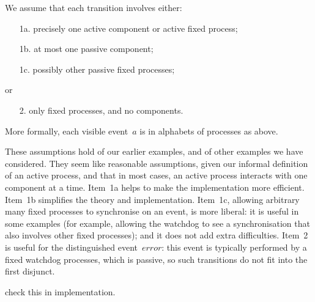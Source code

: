 \begin{assumption}
We assume that each transition involves either:
%
\begin{enumerate}
\item[1a.] precisely one active component or active fixed process;
\item[1b.] at most one passive component;
\item[1c.] possibly other passive fixed processes;
\end{enumerate}
%
or
\begin{enumerate}
\item[2.] only fixed processes, and no components.
\end{enumerate}
%
More formally, each visible event~$a$ is in alphabets of processes as above. 
\end{assumption}
%
These assumptions hold of our earlier examples, and of other examples we have
considered.  They seem like reasonable assumptions, given our informal
definition of an active process, and that in most cases, an active process
interacts with one component at a time.  Item~1a helps to make the
implementation more efficient.  Item~1b simplifies the theory and
implementation.  Item~1c, allowing arbitrary many fixed processes to
synchronise on an event, is more liberal: it is useful in some examples (for
example, allowing the watchdog to see a synchronisation that also involves
other fixed processes); and it does not add extra difficulties.  Item~2 is
useful for the distinguished event~$error$: this event is typically performed
by a fixed watchdog processes, which is passive, so such transitions do not
fit into the first disjunct.


\begin{improve}
check this in implementation.
\end{improve}

